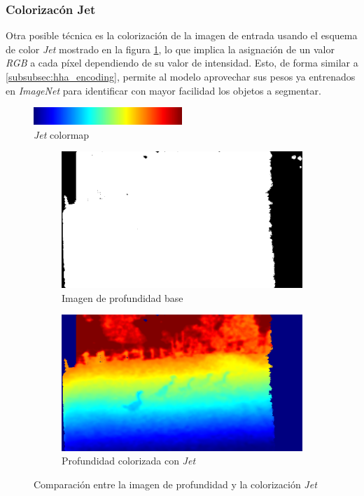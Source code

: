 \documentclass[12pt,a4paper]{report}
\begin{document}
\subsubsection{Colorizacón Jet}
\label{subsubsec:jet_colorization}
Otra posible técnica es la colorización de la imagen de entrada usando el esquema de color \textit{Jet} mostrado en la figura \ref{fig:jet-colormap}, lo que implica la asignación de un valor \textit{RGB} a cada píxel dependiendo de su valor de intensidad. Esto, de forma similar a \ref{subsubsec:hha_encoding}, permite al modelo aprovechar sus pesos ya entrenados en \textit{ImageNet} para identificar con mayor facilidad los objetos a segmentar.
\begin{figure}[!h]
    \centering
    \includegraphics[width=0.5\textwidth]{media/misc/jet_colormap.png}
    \caption{\textit{Jet} colormap}
    \label{fig:jet-colormap}
\end{figure}
\begin{figure}[!h]
    \centering
    \begin{subfigure}{0.45\textwidth}
        \centering
        \includegraphics[width=\textwidth]{media/data/depth_gueese.png}
        \caption{Imagen de profundidad base}
    \end{subfigure}
    \hfill
    \begin{subfigure}{0.45\textwidth}
        \centering
        \includegraphics[width=\textwidth]{media/data/jet_gueese.png}
        \caption{Profundidad colorizada con \textit{Jet}}
    \end{subfigure}
    \caption{Comparación entre la imagen de profundidad y la colorización \textit{Jet}}
    \label{fig:depth-jet-comparison}
\end{figure}
\end{document}
